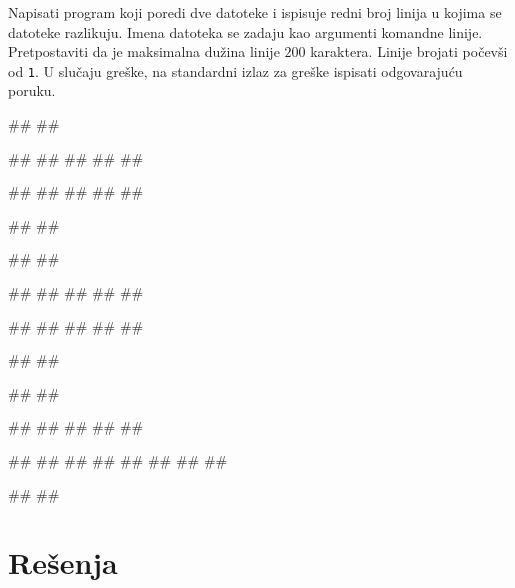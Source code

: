 \begin{Exercise}[label=p3_iv10]         
Napisati program koji poredi dve datoteke i ispisuje redni broj linija u
kojima se datoteke razlikuju. Imena datoteka se zadaju kao argumenti
komandne linije. Pretpostaviti da je maksimalna dužina
linije $200$ karaktera. Linije brojati počevši od {\tt 1}.
 U slučaju greške, na standardni izlaz za greške ispisati odgovarajuću poruku.

\begin{minitest}
\begin{upotreba}{1}
#\naslovPokretanje#
##

##
##
##
##
##

##
##
##
##
##

#\naslovIzlaz#
#\izlaz{}#
\end{upotreba}
\end{minitest}
\begin{minitest}
\begin{upotreba}{2}
#\naslovPokretanje#
##

##
##
##
##
##

##
##
##
##
##

#\naslovIzlaz#
##
\end{upotreba}
\end{minitest}
\begin{minitest}
\begin{upotreba}{3}
#\naslovPokretanje#
##

##
##
##
##
##

##
##
##
##
##
##
##
##

#\naslovIzlaz#
##
\end{upotreba}
\end{minitest}

\end{Exercise}
\begin{Answer}[ref=p3_iv10]
\end{Answer}


\ifresenja
\sstrana
\section{Rešenja}
\shipoutAnswer
\fi


